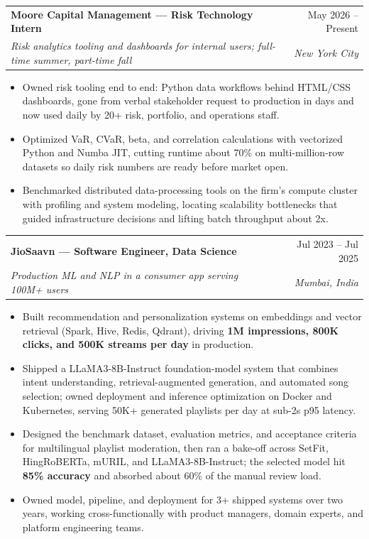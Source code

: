 \documentclass[10pt,letterpaper]{article}
\makeatletter
\newcommand{\est}[1]{\textcolor{red!70!black}{#1}}
\newcommand{\entry}[4]{%
  \begin{tabularx}{\textwidth}{@{}Xr@{}}
    \textbf{#1} & #2 \\
    \textit{#3} & \textit{#4}
  \end{tabularx}\vspace{-0.2em}
}
\makeatother
\begin{document}
\entry{Moore Capital Management --- Risk Technology Intern}{May 2026 -- Present}{Risk analytics tooling and dashboards for internal users; full-time summer, part-time fall}{New York City}
\begin{itemize}
  \item Owned risk tooling end to end: Python data workflows behind HTML/CSS dashboards, gone from verbal stakeholder request to production in days and now used daily by \est{20+} risk, portfolio, and operations staff.
  \item Optimized VaR, CVaR, beta, and correlation calculations with vectorized Python and Numba JIT, cutting runtime about \est{70\%} on multi-million-row datasets so daily risk numbers are ready before market open.
  \item Benchmarked distributed data-processing tools on the firm's compute cluster with profiling and system modeling, locating scalability bottlenecks that guided infrastructure decisions and lifting batch throughput about \est{2x}.
\end{itemize}

\vspace{0.65em}
\entry{JioSaavn --- Software Engineer, Data Science}{Jul 2023 -- Jul 2025}{Production ML and NLP in a consumer app serving 100M+ users}{Mumbai, India}
\begin{itemize}
  \item Built recommendation and personalization systems on embeddings and vector retrieval (Spark, Hive, Redis, Qdrant), driving \textbf{1M impressions, 800K clicks, and 500K streams per day} in production.
  \item Shipped a LLaMA3-8B-Instruct foundation-model system that combines intent understanding, retrieval-augmented generation, and automated song selection; owned deployment and inference optimization on Docker and Kubernetes, serving \est{50K+} generated playlists per day at sub-\est{2s} p95 latency.
  \item Designed the benchmark dataset, evaluation metrics, and acceptance criteria for multilingual playlist moderation, then ran a bake-off across SetFit, HingRoBERTa, mURIL, and LLaMA3-8B-Instruct; the selected model hit \textbf{85\% accuracy} and absorbed about \est{60\%} of the manual review load.
  \item Owned model, pipeline, and deployment for \est{3+} shipped systems over two years, working cross-functionally with product managers, domain experts, and platform engineering teams.
\end{itemize}
\end{document}
